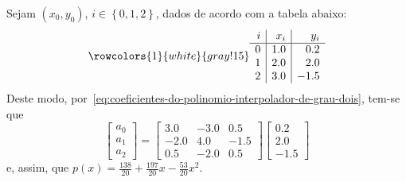 \begin{example}
  Sejam \((x_{0},y_{0})\), \(i\in\left\{0,1,2\right\}\), dados de acordo com a
  tabela abaixo:
  \[
    \rowcolors{1}{white}{gray!15}
    \begin{array}{r|r|r}
      i & x_{i} & y_{i} \\ \hline
      0 &   1.0 &   0.2 \\
      1 &   2.0 &   2.0 \\
      2 &   3.0 &  -1.5
    \end{array}
  \]
  Deste modo,
  por~\eqref{eq:coeficientes-do-polinomio-interpolador-de-grau-dois}, tem-se
  que
  \begin{equation}\label{eq:coeficientes-polinomio-interpolador-de-grau-dois-para-o-primeiro-exemplo}
    \begin{bmatrix}
      a_{0} \\ a_{1} \\ a_{2}
    \end{bmatrix}
    =
    \begin{bmatrix}
      3.0 & -3.0 &  0.5 \\
      -2.0 &  4.0 & -1.5 \\
      0.5 & -2.0 &  0.5
    \end{bmatrix}
    \begin{bmatrix}
      0.2 \\ 2.0 \\ -1.5
    \end{bmatrix}
  \end{equation}
  e, assim, que
  \(p{\left(x\right)}=\frac{138}{20}+\frac{197}{20}x-\frac{53}{20}x^{2}\).
\end{example}
